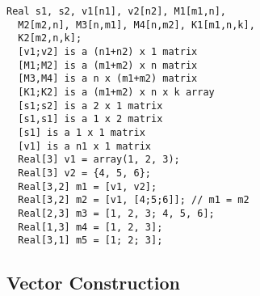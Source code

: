 \begin{example}
\begin{lstlisting}[language=modelica]
  Real s1, s2, v1[n1], v2[n2], M1[m1,n],
  M2[m2,n], M3[n,m1], M4[n,m2], K1[m1,n,k],
  K2[m2,n,k];
  [v1;v2] is a (n1+n2) x 1 matrix
  [M1;M2] is a (m1+m2) x n matrix
  [M3,M4] is a n x (m1+m2) matrix
  [K1;K2] is a (m1+m2) x n x k array
  [s1;s2] is a 2 x 1 matrix
  [s1,s1] is a 1 x 2 matrix
  [s1] is a 1 x 1 matrix
  [v1] is a n1 x 1 matrix
  Real[3] v1 = array(1, 2, 3);
  Real[3] v2 = {4, 5, 6};
  Real[3,2] m1 = [v1, v2];
  Real[3,2] m2 = [v1, [4;5;6]]; // m1 = m2
  Real[2,3] m3 = [1, 2, 3; 4, 5, 6];
  Real[1,3] m4 = [1, 2, 3];
  Real[3,1] m5 = [1; 2; 3];
\end{lstlisting}
\end{example}

\subsection{Vector Construction}

